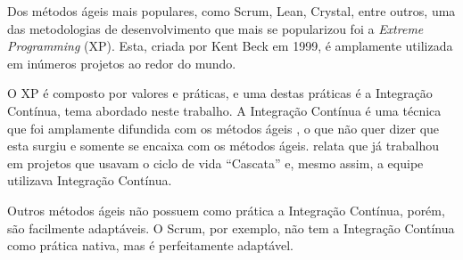 Dos métodos ágeis mais populares, como Scrum, Lean, Crystal, entre outros, uma das metodologias de desenvolvimento que mais se popularizou foi a \textit{Extreme Programming} (XP). Esta, criada por Kent Beck em 1999, é amplamente utilizada em inúmeros projetos ao redor do mundo.

O XP é composto por valores e práticas, e uma destas práticas é a Integração Contínua, tema abordado neste trabalho. A Integração Contínua é uma técnica que foi amplamente difundida com os métodos ágeis \cite{DUVALL-ENTREVISTA}, o que não quer dizer que esta surgiu e somente se encaixa com os métodos ágeis.  relata que já trabalhou em projetos que usavam o ciclo de vida ``Cascata'' e, mesmo assim, a equipe utilizava Integração Contínua.

Outros métodos ágeis não possuem como prática a Integração Contínua, porém, são facilmente adaptáveis. O Scrum, por exemplo, não tem a Integração Contínua como prática nativa, mas é perfeitamente adaptável.
